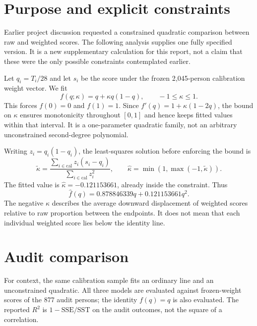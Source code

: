 \documentclass[11pt,a4paper,oneside,headings=normal,parskip=half]{scrreprt}
\begin{document}
\section{Purpose and explicit constraints}
Earlier project discussion requested a constrained quadratic comparison between raw and weighted scores. The following analysis supplies one fully specified version. It is a new supplementary calculation for this report, not a claim that these were the only possible constraints contemplated earlier.

Let $q_i=T_i/28$ and let $s_i$ be the score under the frozen 2,045-person calibration weight vector. We fit
\begin{equation}
 f(q;\kappa)=q+\kappa q(1-q),\qquad -1\le\kappa\le1.\label{eq:reg}
\end{equation}
This forces $f(0)=0$ and $f(1)=1$. Since $f'(q)=1+\kappa(1-2q)$, the bound on $\kappa$ ensures monotonicity throughout $[0,1]$ and hence keeps fitted values within that interval. It is a one-parameter quadratic family, not an arbitrary unconstrained second-degree polynomial.

Writing $z_i=q_i(1-q_i)$, the least-squares solution before enforcing the bound is
\begin{equation}
 \widetilde\kappa=\frac{\sum_{i\in\mathrm{cal}}z_i(s_i-q_i)}{\sum_{i\in\mathrm{cal}}z_i^2},\qquad
 \widehat\kappa=\min(1,\max(-1,\widetilde\kappa)).
\end{equation}
The fitted value is $\widehat\kappa=-0.121153661$, already inside the constraint. Thus
\begin{equation}
 \widehat f(q)=0.878846339q+0.121153661q^2.
\end{equation}
The negative $\kappa$ describes the average downward displacement of weighted scores relative to raw proportion between the endpoints. It does not mean that each individual weighted score lies below the identity line.

\section{Audit comparison}
For context, the same calibration sample fits an ordinary line and an unconstrained quadratic. All three models are evaluated against frozen-weight scores of the 877 audit persons; the identity $f(q)=q$ is also evaluated. The reported $R^2$ is $1-\mathrm{SSE}/\mathrm{SST}$ on the audit outcomes, not the square of a correlation.
\end{document}
